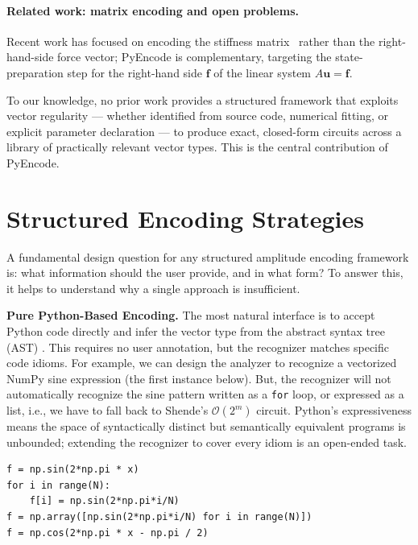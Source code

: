 \documentclass[10pt,twocolumn]{article}
\newcommand{\bigO}[1]{\mathcal{O}(#1)}
\begin{document}
\paragraph{Related work: matrix encoding and open problems.}
Recent work has focused on encoding the stiffness
matrix~\cite{sunderhauf2024block,deiml2024,arora2024} rather than the
right-hand-side force vector; PyEncode is complementary, targeting the
state-preparation step for the right-hand side $\mathbf{f}$ of the
linear system $A\mathbf{u} = \mathbf{f}$.

To our knowledge, no prior work provides a structured framework that
exploits vector regularity --- whether identified from source code,
numerical fitting, or explicit parameter declaration --- to produce
exact, closed-form circuits across a library of practically relevant
vector types.  This is the central contribution of PyEncode.

\section{Structured Encoding Strategies}
\label{sec:strategies}

A fundamental design question for any structured amplitude encoding framework is: what information should the user provide, and in what form? To answer this, it helps to understand why a single approach is insufficient.

\textbf{Pure Python-Based Encoding.}
The most natural interface is to accept Python code directly and infer the vector type from the abstract syntax tree (AST) \cite{aho2006}. This requires no user annotation, but the recognizer matches specific code idioms. For example, we can design the analyzer to recognize a vectorized NumPy sine expression (the first instance below). But, the recognizer will not automatically recognize the sine pattern written as a \texttt{for} loop, or expressed as a list, i.e., we have to fall back to Shende's $\bigO{2^m}$ circuit.  Python's expressiveness means the space of syntactically distinct but semantically equivalent programs is unbounded; extending the recognizer to cover every idiom is an open-ended task.
\begin{lstlisting}[style=python]
f = np.sin(2*np.pi * x)
for i in range(N):
    f[i] = np.sin(2*np.pi*i/N)
f = np.array([np.sin(2*np.pi*i/N) for i in range(N)])
f = np.cos(2*np.pi * x - np.pi / 2)
\end{lstlisting}
\end{document}
